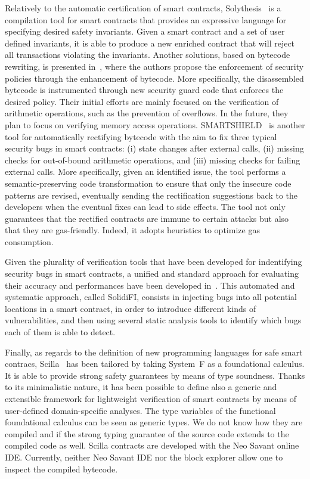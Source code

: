 Relatively to the automatic certification of smart contracts,
Solythesis~\cite{solythesis_solidity_validation} is a compilation tool for smart contracts
that provides an expressive language for specifying desired safety invariants.
Given a smart contract and a set of user defined invariants,
it is able to produce a new enriched contract that will reject all transactions
violating the invariants.
%
Another solutions, based on bytecode rewriting, is presented in~\cite{bytecode_rewriting},
where the authors propose the enforcement of security policies through the enhancement of bytecode.
More specifically, the disassembled bytecode is instrumented through new security guard code
that enforces the desired policy. Their initial efforts are mainly focused on the verification
of arithmetic operations, such as the prevention of overflows. In the future, they plan to focus on
verifying memory access operations.
%
SMARTSHIELD~\cite{smartshield} is another tool for automatically
rectifying bytecode with the aim to fix three typical security bugs in smart contracts:
(i) state changes after external calls, (ii) missing checks for out-of-bound arithmetic operations,
and (iii) missing checks for failing external calls. More specifically, given an identified issue,
the tool performs a semantic-preserving code transformation to ensure that only the insecure code
patterns are revised, eventually sending the rectification suggestions back to the developers
when the eventual fixes can lead to side effects. The tool not only guarantees that the rectified
contracts are immune to certain attacks but also that they are gas-friendly.
Indeed, it adopts heuristics to optimize gas consumption. 

Given the plurality of verification tools that have been developed for indentifying security bugs
in smart contracts, a unified and standard approach for evaluating their accuracy and performances
have been developed in~\cite{effectiveness_analysis_tools}. This automated and systematic approach,
called SolidiFI, consists in injecting bugs into all potential locations in a smart contract,
in order to introduce different kinds of vulnerabilities, and then using several static analysis
tools to identify which bugs each of them is able to detect.

Finally, as regards to the definition of new programming languages for safe smart contracs,
Scilla~\cite{scilla} has been tailored by taking System~F as a foundational calculus.
It is able to provide strong safety guarantees by means of type soundness.
Thanks to its minimalistic nature, it has been possible to define also a generic and extensible
framework for lightweight verification of smart contracts by means of user-defined domain-specific
analyses. The type variables of the functional foundational calculus can be seen as
generic types. We do not know how they are compiled and if the strong typing guarantee of the
source code extends to the compiled code as well. Scilla contracts are developed with
the Neo Savant online IDE. Currently, neither Neo Savant IDE nor the block explorer
allow one to inspect the compiled bytecode.
